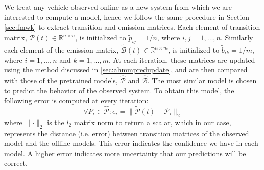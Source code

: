 \documentclass[letterpaper, 10 pt, conference]{ieeeconf}  %
\newcommand\NB[1]{$\spadesuit$\footnote{NB: #1}}
\begin{document}

We treat any vehicle observed online as a new system from which we are interested to compute a model, hence we follow the same procedure in Section \ref{sec:fmwk} to extract transition and emission matrices. Each element of transition matrix, $\tilde{\mathcal{P}}(t)\in\mathbb{R}^{n\times n}$, is initialized to $\tilde{p}_{ij} = 1/n$, where $i,j = 1,\ldots,n$. Similarly each element of the emission matrix,  $\tilde{\mathcal{B}}(t)\in\mathbb{R}^{n\times m}$, is initialized to $\tilde{b}_{ik}= 1/m$, where $i = 1,\ldots,n$ and $k=1,\ldots,m$. At each iteration, these matrices are updated using the method discussed in \ref{sec:ahmmpredupdate}, and are then compared with those of the pretrained models, $\hat{\mathcal{P}}$ and $\hat{\mathcal{B}}$. The most similar model is chosen to predict the behavior of the observed system. To obtain this model, the following error is computed at every iteration:
\begin{equation} \label{eq:pnorm}
    \forall{P_i} \in \hat{\mathcal{P}}: e_i = \lVert\tilde{\mathcal{P}}(t)-\mathcal{P}_{i}\rVert_{2}
\end{equation}
where $\lVert \cdot \rVert_2$ is the $l_2$ matrix norm to return a scalar, which in our case, represents the distance (i.e. error) between transition matrices of the observed model and the offline models. This error indicates the confidence we have in each model. A higher error indicates more uncertainty that our predictions will be correct.
\end{document}
